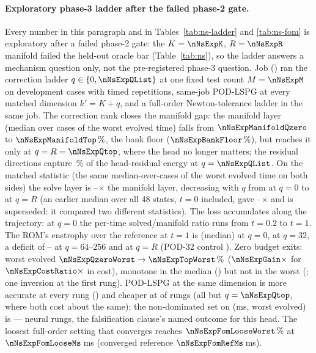 \paragraph{Exploratory phase-3 ladder after the failed phase-2 gate.}
\label{app:extended:ns-ladder}
Every number in this paragraph and in Tables~\ref{tab:ns-ladder} and
\ref{tab:ns-fom} is exploratory after a failed phase-2 gate: the
$K=\nNsExpK$, $R=\nNsExpR$ manifold failed the held-out oracle bar
(Table~\ref{tab:ns}), so the ladder answers a mechanism question only, not
the pre-registered phase-3 question. Job \provNsExpJob{} (\provNsExpGpu)
ran the correction ladder $q\in\{0,\nNsExpQList\}$ at one fixed test
count $M=\nNsExpM$ on \nNsExpCases{} development cases with
\nNsExpReps{} timed repetitions, same-job POD-LSPG at every matched
dimension $k'=K+q$, and a full-order Newton-tolerance ladder in the same
job. The correction rank closes the manifold gap: the manifold layer (median
over cases of the worst evolved time) falls from $\nNsExpManifoldQzero$
to $\nNsExpManifoldTop\,\%$, the bank floor ($\nNsExpBankFloor\,\%$),
but reaches it only at $q=R=\nNsExpQtop$, where the head no longer
matters; the residual directions capture \nNsExpEnergyList\,\% of the
head-residual energy at $q=\nNsExpQList$. On the matched statistic (the
same median-over-cases of the worst evolved time on both sides) the solve
layer is \nNsExpSolveOverManifoldMin--\nNsExpSolveOverManifoldMax$\times$
the manifold layer, decreasing with $q$ from
\nNsExpSolveOverManifoldQzero{} at $q=0$ to \nNsExpSolveOverManifoldQtop{}
at $q=R$ (an earlier median over all 48 states, $t=0$ included, gave
\nNsExpSolveOverManifoldMedFortyEightMin--\nNsExpSolveOverManifoldMedFortyEightMax$\times$
and is superseded: it compared two different statistics). The loss
accumulates along the trajectory: at $q=0$ the per-time solved/manifold
ratio runs \nNsExpSolveOverManifoldPerTimeList{} from $t=0.2$ to $t=1$.
The ROM's enstrophy over the reference at $t=1$ is
\nNsExpEnstrophyQzero{} (median) at $q=0$, \nNsExpEnstrophyQthirtyTwo{} at
$q=32$, a deficit of \nNsExpEnstrophyMidMin--\nNsExpEnstrophyMidMax{} at
$q=64$--$256$ and \nNsExpEnstrophyQtop{} at $q=R$ (POD-32 control
\nNsExpEnstrophyPodThirtyTwo). Zero budget exits:
worst evolved $\nNsExpQzeroWorst\to\nNsExpTopWorst\,\%$
($\nNsExpGain\times$ for $\nNsExpCostRatio\times$ in cost), monotone in
the median (\nNsExpMonotoneMedian) but not in the worst
(\nNsExpMonotoneWorst; one inversion at the first rung). POD-LSPG at the
same dimension is more accurate at every rung
(\nNsExpPodMoreAccurateEveryRung) and cheaper at \nNsExpPodCheaperCount{}
of \nNsExpRungCount{} rungs (all but $q=\nNsExpQtop$, where both cost
about the same); the non-dominated set on (ms, worst evolved) is
\nNsExpNonDomList{} --- \nNsExpNonDomNeuralCount{} neural rungs, the
falsification clause's named outcome for this head. The loosest
full-order setting that converges reaches $\nNsExpFomLooseWorst\,\%$ at
$\nNsExpFomLooseMs$\,ms (converged reference $\nNsExpFomRefMs$\,ms).

